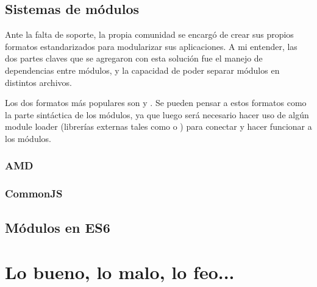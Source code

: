 \subsection{Sistemas de módulos}

Ante la falta de soporte, la propia comunidad se encargó de crear sus propios formatos estandarizados para modularizar sus aplicaciones. A mi entender, las dos partes claves que se agregaron con esta solución fue el manejo de dependencias entre módulos, y la capacidad de poder separar módulos en distintos archivos.

Los dos formatos más populares son  y . Se pueden pensar a estos formatos como la parte sintáctica de los módulos, ya que luego será necesario hacer uso de algún module loader (librerías externas tales como  o ) para conectar y hacer funcionar a los módulos.

\subsubsection{AMD}

\subsubsection{CommonJS}

\subsection{Módulos	en ES6}



\section{Lo bueno, lo malo, lo feo...}